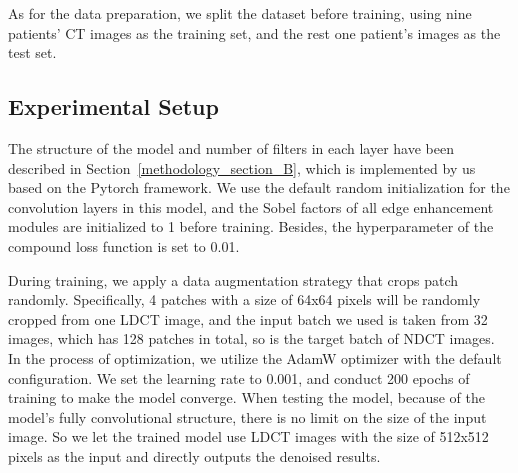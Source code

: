 \documentclass[conference]{IEEEtran}
\begin{document}
            As for the data preparation, we split the dataset before training, using nine patients' CT images as the training set, and the rest one patient's images as the test set.
            
        \subsection{Experimental Setup}
            The structure of the model and number of filters in each layer have been described in Section~\ref{methodology_section_B}, which is implemented by us based on the Pytorch framework\cite{NIPS2019_9015}. 
            We use the default random initialization for the convolution layers in this model, and the Sobel factors of all edge enhancement modules are initialized to 1 before training.
            Besides, the hyperparameter  of the compound loss function is set to 0.01.

            During training, we apply a data augmentation strategy that crops patch randomly.
            Specifically, 4 patches with a size of 64x64 pixels will be randomly cropped from one LDCT image, and the input batch we used is taken from 32 images, which has 128 patches in total, so is the target batch of NDCT images.
            In the process of optimization, we utilize the AdamW optimizer\cite{loshchilov2018fixing} with the default configuration.
            We set the learning rate to 0.001, and conduct 200 epochs of training to make the model converge.
            When testing the model, because of the model's fully convolutional structure, there is no limit on the size of the input image. 
            So we let the trained model use LDCT images with the size of 512x512 pixels as the input and directly outputs the denoised results.
\end{document}
